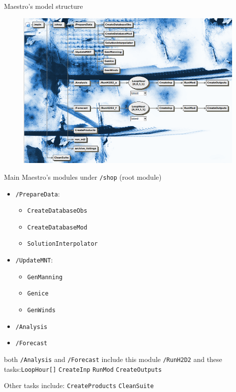 \documentclass{beamer}
\begin{document}
\begin{frame}[allowframebreaks]{Maestro's model structure}
\begin{figure}
\includegraphics[scale=0.5]{800px-Flow.png}
\end{figure}

\framebreak

Main Maestro's modules under \texttt{/shop} (root module)
\begin{itemize}
\item \texttt{/PrepareData}:
\begin{itemize}
\item \texttt{CreateDatabaseObs}
\item \texttt{CreateDatabaseMod} 
\item \texttt{SolutionInterpolator} 
\end{itemize}
\item \texttt{/UpdateMNT}: 
\begin{itemize}
\item \texttt{GenManning} 
\item \texttt{Genice}
\item \texttt{GenWinds} 
\end{itemize}

\item \texttt{/Analysis} 
\item \texttt{/Forecast} 
\end{itemize}
both \texttt{/Analysis} and \texttt{/Forecast} include this module \texttt{/RunH2D2} and these tasks:\texttt{LoopHour[]} \texttt{CreateInp} \texttt{RunMod} \texttt{CreateOutputs}

Other tasks include: \texttt{CreateProducts} \texttt{CleanSuite}
\end{frame}



\end{document}
